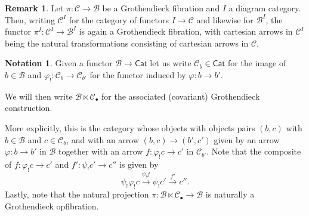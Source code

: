 \documentclass[a4paper,10pt
,draft
]{article}%
\numberwithin{equation}{section}
\numberwithin{figure}{section}
\theoremstyle{definition} %
\newtheorem{remark}[equation]{Remark}%
\newtheorem{notation}[equation]{Notation}%
\newcommand{\1}{\ensuremath{\mathbbm 1}}%
\begin{document}
\begin{remark}\label{FUNISGROTH REM}
Let $\pi \colon \mathcal{C} \to \mathcal{B}$
be a Grothendieck fibration and
$I$ a diagram category.
Then, 
writing $\mathcal{C}^{I}$ for the category of functors 
$I \to \mathcal{C}$ and likewise for $\mathcal{B}^I$,
the functor
$\pi^I \colon \mathcal{C}^I \to \mathcal{B}^I$
is again a Grothendieck fibration, with cartesian arrows in $\mathcal{C}^I$ being the natural transformations consisting of cartesian arrows in $\mathcal{C}$.
\end{remark}





\begin{notation}\label{GROTHCONS NOT}
Given a functor $\mathcal{B} \to \mathsf{Cat}$
let us write
$\mathcal{C}_b \in \mathsf{Cat}$
for the image of $b \in \mathcal{B}$ and 
$\varphi_! \colon \mathcal{C}_{b} \to \mathcal{C}_{b'}$
for the functor induced by
$\varphi \colon b \to b'$.

We will then write 
$\mathcal{B} \ltimes \mathcal{C}_{\bullet}$
for the associated (covariant) Grothendieck construction.

More explicitly, this is
the category whose objects 
with objects pairs 
$(b,c)$ with $b \in \mathcal{B}$ and $c \in \mathcal{C}_b$,
and with an arrow
$(b,c) \to (b',c')$
given by an arrow 
$\varphi \colon b \to b'$ in $\mathcal{B}$
together with an arrow
$f \colon \varphi_! c \to c'$ in $\mathcal{C}_{b'}$.
%
Note that the composite of 
$f \colon \varphi_! c \to c'$ and
$f' \colon \psi_! c' \to c''$ is given by
\[
\psi_! \varphi_! c \xrightarrow{\psi_!f}
\psi_! c' \xrightarrow{f'}
 c''.
\]
Lastly, note that the natural projection
$\pi \colon \mathcal{B} \ltimes \mathcal{C}_{\bullet} \to \mathcal{B}$
is naturally a Grothendieck opfibration.
\end{notation}
\end{document}

